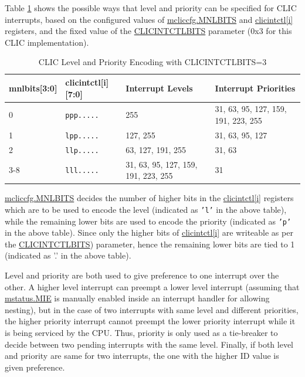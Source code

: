 \documentclass[main\_\_EN.tex]{subfiles}
\begin{document}
Table \ref{tab:riscv-clic-level-priority} shows the possible ways that level and priority can be specified for CLIC interrupts, based on the configured values of \hyperref[fielddesc:MCLICCFG_MNLBITS]{mcliccfg.MNLBITS}
and \hyperref[regdesc:MCLICINTCTL_REG_i]{clicintctl[i]} registers, and the fixed value of the \hyperref[fielddesc:CLICINFO_CLICINTCTLBITS]{CLICINTCTLBITS} parameter (0x3 for this CLIC implementation).

\begin{longtable}{ | l | l | l | l | }
\caption{CLIC Level and Priority Encoding with CLICINTCTLBITS=3}
\label{tab:riscv-clic-level-priority}
\\\hline
\rowcolor{lightgray}
mnlbits[3:0] & clicintctl[i][7:0] & Interrupt Levels & Interrupt Priorities \\ \hline
0   & \texttt{ppp.....} & 255 & 31, 63, 95, 127, 159, 191, 223, 255 \\ \hline
1   & \texttt{lpp.....} & 127, 255 & 31, 63, 95, 127 \\ \hline
2   & \texttt{llp.....} & 63, 127, 191, 255 & 31, 63 \\ \hline
3-8 & \texttt{lll.....} & 31, 63, 95, 127, 159, 191, 223, 255 & 31 \\ \hline
\end{longtable}

\hyperref[fielddesc:MCLICCFG_MNLBITS]{mcliccfg.MNLBITS} decides the number of higher bits in the \hyperref[regdesc:MCLICINTCTL_REG_i]{clicintctl[i]} registers which are to be used to encode the level (indicated as \texttt{'l'} in the above table), while the remaining lower bits are used to encode the priority (indicated as \texttt{'p'} in the above table). Since only the higher bits of \hyperref[regdesc:MCLICINTCTL_REG_i]{clicintctl[i]} are writeable as per the \hyperref[fielddesc:CLICINFO_CLICINTCTLBITS]{CLICINTCTLBITS}) parameter, hence the remaining lower bits are tied to 1 (indicated as '.' in the above table).

Level and priority are both used to give preference to one interrupt over the other. A higher level interrupt can preempt a lower level interrupt (assuming that \hyperref[fielddesc:MSTATUSMIE]{mstatus.MIE} is manually enabled inside an interrupt handler for allowing nesting), but in the case of two interrupts with same level and different priorities, the higher priority interrupt cannot preempt the lower priority interrupt while it is being serviced by the CPU. Thus, priority is only used as a tie-breaker to decide between two pending interrupts with the same level. Finally, if both level and priority are same for two interrupts, the one with the higher ID value is given preference.
\end{document}
